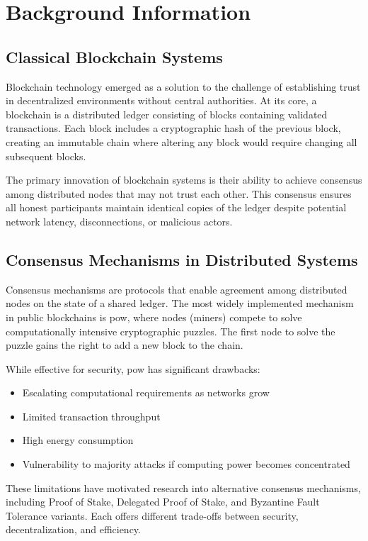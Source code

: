 \documentclass[11pt,a4paper]{article}
\begin{document}
\section{Background Information}

\subsection{Classical Blockchain Systems}
Blockchain technology emerged as a solution to the challenge of establishing trust in decentralized environments without central authorities. At its core, a blockchain is a distributed ledger consisting of blocks containing validated transactions. Each block includes a cryptographic hash of the previous block, creating an immutable chain where altering any block would require changing all subsequent blocks.

The primary innovation of blockchain systems is their ability to achieve consensus among distributed nodes that may not trust each other. This consensus ensures all honest participants maintain identical copies of the ledger despite potential network latency, disconnections, or malicious actors.

\subsection{Consensus Mechanisms in Distributed Systems}
Consensus mechanisms are protocols that enable agreement among distributed nodes on the state of a shared ledger. The most widely implemented mechanism in public blockchains is \gls{pow}, where nodes (miners) compete to solve computationally intensive cryptographic puzzles. The first node to solve the puzzle gains the right to add a new block to the chain.

While effective for security, \gls{pow} has significant drawbacks:
\begin{itemize}
    \item Escalating computational requirements as networks grow
    \item Limited transaction throughput
    \item High energy consumption
    \item Vulnerability to majority attacks if computing power becomes concentrated
\end{itemize}

These limitations have motivated research into alternative consensus mechanisms, including Proof of Stake, Delegated Proof of Stake, and Byzantine Fault Tolerance variants. Each offers different trade-offs between security, decentralization, and efficiency.
\end{document}
